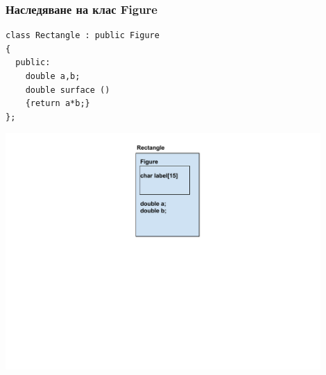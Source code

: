\documentclass{beamer}
\begin{document}
\begin{frame}[fragile]
\frametitle{Наследяване на клас Figure}


\begin{flushleft}
\begin{lstlisting}
class Rectangle : public Figure
{
  public:
    double a,b;
    double surface ()
    {return a*b;}
};
\end{lstlisting}  
\end{flushleft}


\begin{center}
\includegraphics[width=12.0cm]{images/inmem_rectangle}
\end{center}


\end{frame}
\end{document}
